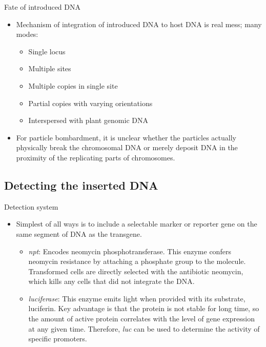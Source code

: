 \documentclass[11pt,dvipsnames,ignorenonframetext,aspectratio=169]{beamer}
\providecommand{\tightlist}{%
  \setlength{\itemsep}{0pt}\setlength{\parskip}{0pt}}
\begin{document}
\begin{frame}{Fate of introduced DNA}
\protect\hypertarget{fate-of-introduced-dna}{}
\begin{itemize}
\tightlist
\item
  Mechanism of integration of introduced DNA to host DNA is real mess;
  many modes:

  \begin{itemize}
  \tightlist
  \item
    Single locus
  \item
    Multiple sites
  \item
    Multiple copies in single site
  \item
    Partial copies with varying orientations
  \item
    Interspersed with plant genomic DNA
  \end{itemize}
\item
  For particle bombardment, it is unclear whether the particles actually
  physically break the chromosomal DNA or merely deposit DNA in the
  proximity of the replicating parts of chromosomes.
\end{itemize}
\end{frame}

\hypertarget{detecting-the-inserted-dna}{%
\subsection{Detecting the inserted
DNA}\label{detecting-the-inserted-dna}}

\begin{frame}{Detection system}
\protect\hypertarget{detection-system}{}
\begin{itemize}
\tightlist
\item
  Simplest of all ways is to include a selectable marker or reporter
  gene on the same segment of DNA as the transgene.

  \begin{itemize}
  \tightlist
  \item
    \emph{npt}: Encodes neomycin phosphotransferase. This enzyme confers
    neomycin resistance by attaching a phosphate group to the molecule.
    Transformed cells are directly selected with the antibiotic
    neomycin, which kills any cells that did not integrate the DNA.
  \item
    \emph{luciferase}: This enzyme emits light when provided with its
    substrate, luciferin. Key advantage is that the protein is not
    stable for long time, so the amount of active protein correlates
    with the level of gene expression at any given time. Therefore,
    \emph{luc} can be used to determine the activity of specific
    promoters.
  \end{itemize}
\end{itemize}
\end{frame}
\end{document}
